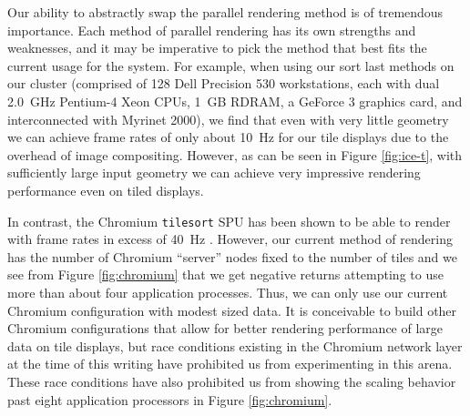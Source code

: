 \documentclass{acmsiggraph}
\newcommand{\sticky}[1]{}
\newcommand{\cidentifier}[1]{\texttt{#1}}
\begin{document}

  Our ability to abstractly swap the parallel rendering method is of
  tremendous importance.  Each method of parallel rendering has its own
  strengths and weaknesses, and it may be imperative to pick the method
  that best fits the current usage for the system.  For example, when using
  our sort last methods on our cluster (comprised of 128 Dell Precision 530
  workstations, each with dual 2.0~GHz Pentium-4 Xeon CPUs, 1~GB RDRAM, a
  GeForce 3 graphics card, and interconnected with Myrinet 2000), we find
  that even with very little geometry we can achieve frame rates of only
  about 10~Hz for our tile displays due to the overhead of image
  compositing.  However, as can be seen in Figure \ref{fig:ice-t}, with
  sufficiently large input geometry we can achieve very impressive
  rendering performance even on tiled displays.

  In contrast, the Chromium \cidentifier{tile\-sort} SPU has been shown to
  be able to render with frame rates in excess of 40~Hz \cite{Humphreys02}.
  However, our current method of rendering has the number of Chromium
  ``server'' nodes fixed to the number of tiles and we see from Figure
  \ref{fig:chromium} that we get negative returns attempting to use more
  than about four application processes.  Thus, we can only use our current
  Chromium configuration with modest sized data.  It is conceivable to
  build other Chromium configurations that allow for better rendering
  performance of large data on tile displays, but race conditions existing
  in the Chromium network layer at the time of this writing have prohibited
  us from experimenting in this arena.  These race conditions have also
  prohibited us from showing the scaling behavior past eight application
  processors in Figure \ref{fig:chromium}.

\end{document}
